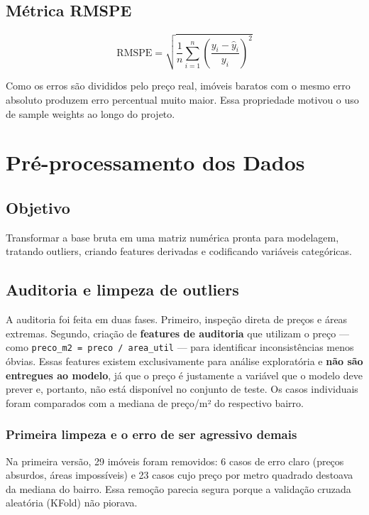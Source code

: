 \documentclass[12pt,a4paper]{article}
\begin{document}
\subsection{Métrica RMSPE}

\begin{equation}
\text{RMSPE} = \sqrt{\frac{1}{n}\sum_{i=1}^{n}\left(\frac{y_i - \hat{y}_i}{y_i}\right)^2}
\end{equation}

Como os erros são divididos pelo preço real, imóveis baratos com o mesmo erro absoluto produzem erro percentual muito maior. Essa propriedade motivou o uso de sample weights ao longo do projeto.

\section{Pré-processamento dos Dados}

\subsection{Objetivo}

Transformar a base bruta em uma matriz numérica pronta para modelagem, tratando outliers, criando features derivadas e codificando variáveis categóricas.

\subsection{Auditoria e limpeza de outliers}

A auditoria foi feita em duas fases. Primeiro, inspeção direta de preços e áreas extremas. Segundo, criação de \textbf{features de auditoria} que utilizam o preço --- como \lstinline{preco_m2 = preco / area_util} --- para identificar inconsistências menos óbvias. Essas features existem exclusivamente para análise exploratória e \textbf{não são entregues ao modelo}, já que o preço é justamente a variável que o modelo deve prever e, portanto, não está disponível no conjunto de teste. Os casos individuais foram comparados com a mediana de preço/m² do respectivo bairro.

\subsubsection{Primeira limpeza e o erro de ser agressivo demais}

Na primeira versão, 29 imóveis foram removidos: 6 casos de erro claro (preços absurdos, áreas impossíveis) e 23 casos cujo preço por metro quadrado destoava da mediana do bairro. Essa remoção parecia segura porque a validação cruzada aleatória (KFold) não piorava.
\end{document}
